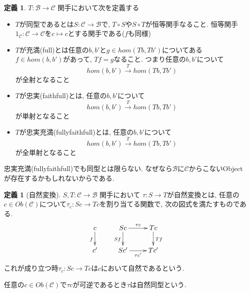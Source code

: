 \documentclass[dvipdfmx,a4paper,11pt]{report}
\theoremstyle{definition}
\newtheorem{dfn}[thm]{定義}
\begin{document}
 \begin{tcolorbox}
 [colback = white, colframe = green!35!black, fonttitle = \bfseries,breakable = true]
\begin{dfn}
$T : \mathcal{B} \to\mathcal{C}$ 関手において次を定義する
\begin{itemize}
\item $T$が同型であるとは$S : \mathcal{C} \to \mathcal{B}$で, $T \circ S$や$S \circ T$が恒等関手なること. 
恒等関手$1_{\mathcal{C}} : \mathcal{C} \to \mathcal{C}$を$c \mapsto c$とする関手である($f$も同様)
\item $T$が充満(full)とは任意の$b, b'$と$g \in hom(Tb, Tb')$についてある$f \in hom(b,b')$があって, $Tf =g$なること. つまり任意の$b, b'$について
$$
hom(b,b')
\overset{T}{\longrightarrow}
hom(Tb, Tb')
$$
が全射となること
\item $T$が忠実(faithfull)とは, 任意の$b, b'$について
$$
hom(b,b')
\overset{T}{\longrightarrow}
hom(Tb, Tb')
$$
が単射となること
\item $T$が忠実充満(fullyfaithfull)とは, 任意の$b, b'$について
$$
hom(b,b')
\overset{T}{\longrightarrow}
hom(Tb, Tb')
$$
が全単射となること
\end{itemize}
\end{dfn}
 \end{tcolorbox}

忠実充満(fullyfaithfull)でも同型とは限らない. なぜなら$\mathcal{B}$に$\mathcal{C}$からこないObjectが存在するかもしれないからである. 


 \begin{tcolorbox}
 [colback = white, colframe = green!35!black, fonttitle = \bfseries,breakable = true]
\begin{dfn}[自然変換]
$S, T :  \mathcal{C} \to \mathcal{B}$ 関手において
$\tau : S \to T$が自然変換とは, 任意の$c \in Ob(\mathcal{C})$について$\tau_c : Sc \to Tc$を割り当てる関数で, 次の図式を満たすものである.
\begin{equation*}
\xymatrix@C=25pt@R=20pt{
c\ar@{->}[d]_{f}&Sc\ar@{->}[d]_{Sf}  \ar@{->}[r]^{\tau c} & Tc\ar@{->}[d]^{Tf} \\
c'&Sc'\ar@{->}[r]_{\tau c'} & Tc'\\   
}
\end{equation*}
これが成り立つ時$\tau_c : Sc \to Tc$は$c$において自然であるという. 

任意の$c \in Ob(\mathcal{C})$で$\tau c$が可逆であるとき$\tau$は自然同型という. 
\end{dfn}
 \end{tcolorbox}
\end{document}
